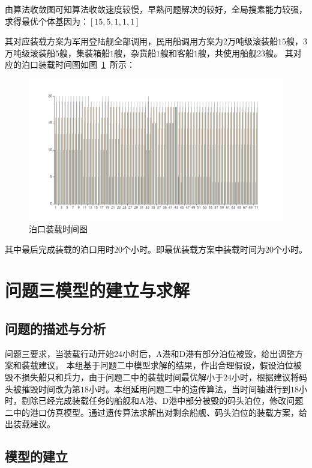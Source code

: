 \documentclass{whutmod}
\begin{document}
     	由算法收敛图可知算法收敛速度较慢，早熟问题解决的较好，全局搜素能力较强，求得最优个体基因为：$[15,5,1,1,1]$
     	
     	其对应装载方案为军用登陆舰全部调用，民用船调用方案为2万吨级滚装船$15$艘，3万吨级滚装船$5$艘，集装箱船$1$艘，杂货船$1$艘和客船$1$艘，共使用船舰$23$艘。
     	其对应的泊口装载时间图如图~\ref{sbsb}~所示：
     	\begin{figure}[H]
     		\centering
     		\includegraphics[width=\textwidth]{figures/bo1.png}
     		\caption{泊口装载时间图}\label{sbsb}
     	\end{figure}
     	
     	其中最后完成装载的泊口用时$20$个小时。即最优装载方案中装载时间为$20$个小时。
     	
     \section{问题三模型的建立与求解}
   	\subsection{问题的描述与分析}
   	问题三要求，当装载行动开始24小时后，A港和D港有部分泊位被毁，给出调整方案和装载建议。
   	本组基于问题二中模型求解的结果，作出合理假设，假设泊位被毁不损失船只和兵力，由于问题二中的装载时间最优解小于$24$小时，根据建议将码头被摧毁时间改为第$18$小时。本组延用问题二中的遗传算法，当时间轴进行到$18$小时，剔除已经完成装载任务的船舰和A港、D港中部分被毁的码头泊位，修改问题二中的港口仿真模型。通过遗传算法求解出对剩余船舰、码头泊位的装载方案，给出装载建议。
  \subsection{模型的建立}
\end{document}
